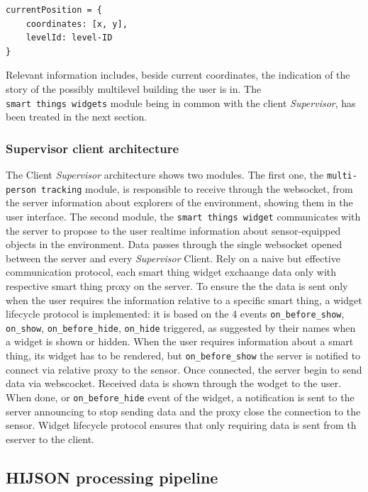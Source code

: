 \documentclass{sig-alternate}
\begin{document}
\begin{verbatim}
currentPosition = {
    coordinates: [x, y],
    levelId: level-ID  
}
\end{verbatim}

Relevant information includes, beside current coordinates, the
indication of the story of the possibly multilevel building the user is
in. The \texttt{smart\ things\ widgets} module being in common with the
client \emph{Supervisor}, has been treated in the next section.

\subsubsection{Supervisor client architecture}\label{client-supervisor-architecture}

The Client \emph{Supervisor} architecture shows two modules. The first
one, the \texttt{multi-person\ tracking} module, is responsible to
receive through the websocket, from the server information about
explorers of the environment, showing them in the user interface. The
second module, the \texttt{smart\ things\ widget} communicates with the
server to propose to the user realtime information about sensor-equipped
objects in the environment. Data passes through the single websocket
opened between the server and every \emph{Supervisor} Client. Rely on a
naive but effective communication protocol, each smart thing widget
exchaange data only with respective smart thing proxy on the server. To
ensure the the data is sent only when the user requires the information
relative to a specific smart thing, a widget lifecycle protocol is
implemented: it is based on the 4 events \texttt{on\_before\_show},
\texttt{on\_show}, \texttt{on\_before\_hide}, \texttt{on\_hide}
triggered, as suggested by their names when a widget is shown or hidden.
When the user requires information about a smart thing, its widget has
to be rendered, but \texttt{on\_before\_show} the server is notified to
connect via relative proxy to the sensor. Once connected, the server
begin to send data via webscocket. Received data is shown through the
wodget to the user. When done, or \texttt{on\_before\_hide} event of the
widget, a notification is sent to the server announcing to stop sending
data and the proxy close the connection to the sensor. Widget lifecycle
protocol ensures that only requiring data is sent from th eserver to the
client.

\subsection{HIJSON processing pipeline}\label{hijson-processing-pipeline}
\end{document}
